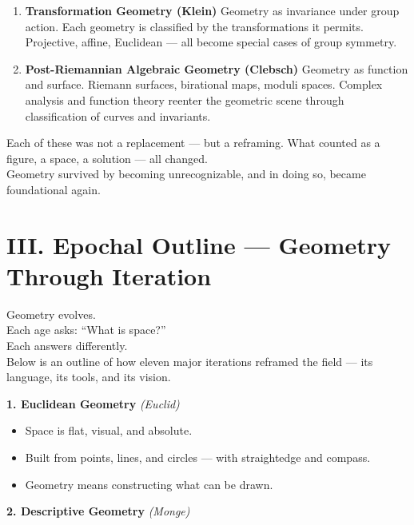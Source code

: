 \documentclass[9pt]{article}
\begin{document}
\begin{enumerate}
  \item \textbf{Transformation Geometry (Klein)}  
  Geometry as invariance under group action. Each geometry is classified by the transformations it permits. Projective, affine, Euclidean — all become special cases of group symmetry.\\

  \item \textbf{Post-Riemannian Algebraic Geometry (Clebsch)}  
  Geometry as function and surface. Riemann surfaces, birational maps, moduli spaces. Complex analysis and function theory reenter the geometric scene through classification of curves and invariants.
\end{enumerate}

\vspace{1em}

\noindent
Each of these was not a replacement — but a reframing.  
What counted as a figure, a space, a solution — all changed.  \\

\noindent
Geometry survived by becoming unrecognizable, and in doing so, became foundational again.

\newpage

\section*{III. Epochal Outline — Geometry Through Iteration}

\noindent
Geometry evolves.  \\
Each age asks: “What is space?” \\
Each answers differently.\\

\noindent
Below is an outline of how eleven major iterations reframed the field — its language, its tools, and its vision.

\bigskip

\textbf{1. Euclidean Geometry} \hfill \textit{(Euclid)}

\begin{itemize}
  \item Space is flat, visual, and absolute.
  \item Built from points, lines, and circles — with straightedge and compass.
  \item Geometry means constructing what can be drawn.
\end{itemize}

\bigskip

\textbf{2. Descriptive Geometry} \hfill \textit{(Monge)}
\end{document}
